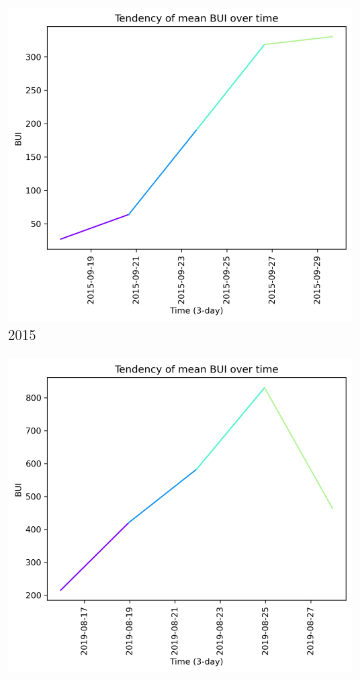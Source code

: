 \begin{figure}[h]
    \centering
    \caption{BUI values 15 days prior to wildfire}
    \begin{subfigure}{0.3\textwidth}
        \centering
        \includegraphics[width=\textwidth]{graphs/2015/15daysprior/2015_15daysprior_tendency_graph_BUI.png}
        \caption{2015}
        \label{fig:bui_prior_15_days_2015}
    \end{subfigure}
    \hfill
    \begin{subfigure}{0.3\textwidth}
        \centering
        \includegraphics[width=\textwidth]{graphs/2019/15daysprior/2019_15daysprior_tendency_graph_BUI.png}

\end{subfigure}
\end{figure}
